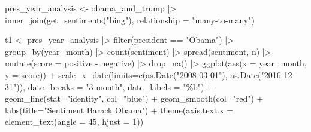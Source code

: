 \documentclass[
  letterpaper,
  DIV=11,
  numbers=noendperiod]{scrartcl}
\newenvironment{Shaded}{\begin{snugshade}}{\end{snugshade}}
\newcommand{\AttributeTok}[1]{\textcolor[rgb]{0.40,0.45,0.13}{#1}}
\newcommand{\DecValTok}[1]{\textcolor[rgb]{0.68,0.00,0.00}{#1}}
\newcommand{\FunctionTok}[1]{\textcolor[rgb]{0.28,0.35,0.67}{#1}}
\newcommand{\NormalTok}[1]{\textcolor[rgb]{0.00,0.23,0.31}{#1}}
\newcommand{\OtherTok}[1]{\textcolor[rgb]{0.00,0.23,0.31}{#1}}
\newcommand{\SpecialCharTok}[1]{\textcolor[rgb]{0.37,0.37,0.37}{#1}}
\newcommand{\StringTok}[1]{\textcolor[rgb]{0.13,0.47,0.30}{#1}}
\begin{document}
\begin{Shaded}
\begin{Highlighting}[]
\NormalTok{pres\_year\_analysis }\OtherTok{\textless{}{-}}\NormalTok{ obama\_and\_trump }\SpecialCharTok{|\textgreater{}} 
  \FunctionTok{inner\_join}\NormalTok{(}\FunctionTok{get\_sentiments}\NormalTok{(}\StringTok{"bing"}\NormalTok{), }\AttributeTok{relationship =} \StringTok{"many{-}to{-}many"}\NormalTok{)}

\NormalTok{t1 }\OtherTok{\textless{}{-}}\NormalTok{ pres\_year\_analysis }\SpecialCharTok{|\textgreater{}} 
  \FunctionTok{filter}\NormalTok{(president }\SpecialCharTok{==} \StringTok{"Obama"}\NormalTok{) }\SpecialCharTok{|\textgreater{}} 
  \FunctionTok{group\_by}\NormalTok{(year\_month) }\SpecialCharTok{|\textgreater{}} 
  \FunctionTok{count}\NormalTok{(sentiment) }\SpecialCharTok{|\textgreater{}}
  \FunctionTok{spread}\NormalTok{(sentiment, n) }\SpecialCharTok{|\textgreater{}}
  \FunctionTok{mutate}\NormalTok{(}\AttributeTok{score =}\NormalTok{ positive }\SpecialCharTok{{-}}\NormalTok{ negative) }\SpecialCharTok{|\textgreater{}}
  \FunctionTok{drop\_na}\NormalTok{() }\SpecialCharTok{|\textgreater{}} 
  \FunctionTok{ggplot}\NormalTok{(}\FunctionTok{aes}\NormalTok{(}\AttributeTok{x =}\NormalTok{ year\_month, }\AttributeTok{y =}\NormalTok{ score)) }\SpecialCharTok{+}
  \FunctionTok{scale\_x\_date}\NormalTok{(}\AttributeTok{limits=}\FunctionTok{c}\NormalTok{(}\FunctionTok{as.Date}\NormalTok{(}\StringTok{"2008{-}03{-}01"}\NormalTok{), }\FunctionTok{as.Date}\NormalTok{(}\StringTok{"2016{-}12{-}31"}\NormalTok{)), }\AttributeTok{date\_breaks =} \StringTok{"3 month"}\NormalTok{, }\AttributeTok{date\_labels =} \StringTok{"\%b"}\NormalTok{) }\SpecialCharTok{+} 
  \FunctionTok{geom\_line}\NormalTok{(}\AttributeTok{stat=}\StringTok{"identity"}\NormalTok{, }\AttributeTok{col=}\StringTok{"blue"}\NormalTok{) }\SpecialCharTok{+} \FunctionTok{geom\_smooth}\NormalTok{(}\AttributeTok{col=}\StringTok{"red"}\NormalTok{) }\SpecialCharTok{+} 
  \FunctionTok{labs}\NormalTok{(}\AttributeTok{title=}\StringTok{"Sentiment Barack Obama"}\NormalTok{) }\SpecialCharTok{+} 
  \FunctionTok{theme}\NormalTok{(}\AttributeTok{axis.text.x =} \FunctionTok{element\_text}\NormalTok{(}\AttributeTok{angle =} \DecValTok{45}\NormalTok{, }\AttributeTok{hjust =} \DecValTok{1}\NormalTok{))}


\end{Highlighting}
\end{Shaded}
\end{document}

